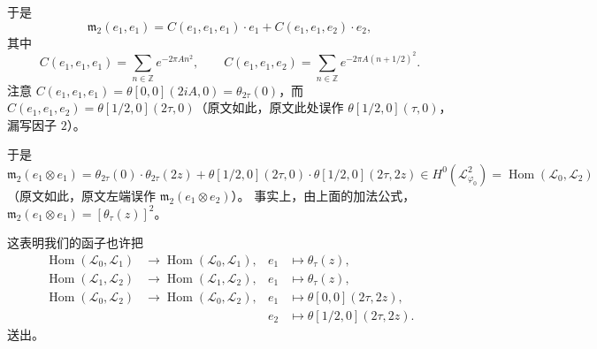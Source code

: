 \documentclass[11pt,a4paper]{article}
\theoremstyle{plain}
\theoremstyle{definition}
\begin{document}
于是
\[
  \mathfrak{m}_2(e_1,e_1)=C(e_1,e_1,e_1)\cdot e_1+C(e_1,e_1,e_2)\cdot e_2,
\]
其中
\[
  C(e_1,e_1,e_1)=\sum_{n\in\mathbb{Z}}e^{-2\pi An^2},
  \qquad
  C(e_1,e_1,e_2)=\sum_{n\in\mathbb{Z}}e^{-2\pi A(n+1/2)^2}.
\]
注意 $C(e_1,e_1,e_1)=\theta[0,0](2iA,0)=\theta_{2\tau}(0)$，而 $C(e_1,e_1,e_2)=\theta[1/2,0](2\tau,0)$（原文如此，原文此处误作 $\theta[1/2,0](\tau,0)$，漏写因子 $2$）。


于是 $\mathfrak{m}_2(e_1\otimes e_1)=\theta_{2\tau}(0)\cdot\theta_{2\tau}(2z)+\theta[1/2,0](2\tau,0)\cdot\theta[1/2,0](2\tau,2z)\in H^0(\mathcal{L}_{\varphi_0}^2)=\operatorname{Hom}(\mathcal{L}_0,\mathcal{L}_2)$（原文如此，原文左端误作 $\mathfrak{m}_2(e_1\otimes e_2)$）。
事实上，由上面的加法公式，$\mathfrak{m}_2(e_1\otimes e_1)=[\theta_\tau(z)]^2$。

这表明我们的函子也许把
\[
\begin{aligned}
\operatorname{Hom}(\mathcal{L}_0,\mathcal{L}_1)&\to\operatorname{Hom}(\mathcal{L}_0,\mathcal{L}_1),
  & e_1&\mapsto\theta_\tau(z),\\
\operatorname{Hom}(\mathcal{L}_1,\mathcal{L}_2)&\to\operatorname{Hom}(\mathcal{L}_1,\mathcal{L}_2),
  & e_1&\mapsto\theta_\tau(z),\\
\operatorname{Hom}(\mathcal{L}_0,\mathcal{L}_2)&\to\operatorname{Hom}(\mathcal{L}_0,\mathcal{L}_2),
  & e_1&\mapsto\theta[0,0](2\tau,2z),\\
&& e_2&\mapsto\theta[1/2,0](2\tau,2z).
\end{aligned}
\]
送出。

\end{document}
